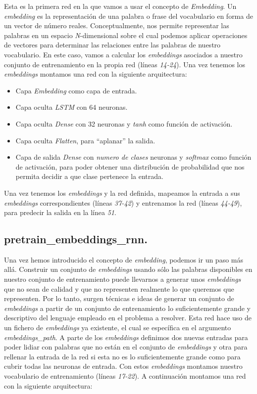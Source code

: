 \documentclass[11pt]{article}
\begin{document}
Esta es la primera red en la que vamos a usar el concepto de \textit{Embedding}. Un \textit{embedding} es la representación de una palabra o frase del vocabulario en forma de un vector de número reales. Conceptualmente, nos permite representar las palabras en un espacio \textit{N}-dimensional sobre el cual podemos aplicar operaciones de vectores para determinar las relaciones entre las palabras de nuestro vocabulario. En este caso, vamos a calcular los \textit{embeddings} asociados a nuestro conjunto de entrenamiento en la propia red (líneas \textit{14-24}). Una vez tenemos los \textit{embeddings} montamos una red con la siguiente arquitectura:
\begin{itemize}
    \item Capa \textit{Embedding} como capa de entrada.
    \item Capa oculta \textit{LSTM} con 64 neuronas.
    \item Capa oculta \textit{Dense} con 32 neuronas y \textit{tanh} como función de activación.
    \item Capa oculta \textit{Flatten}, para ``aplanar'' la salida.
    \item Capa de salida \textit{Dense} con \textit{numero de clases} neuronas y \textit{softmax} como función de activación, para poder obtener una distribución de probabilidad que nos permita decidir a que clase pertenece la entrada.
\end{itemize}

Una vez tenemos los \textit{embeddings} y la red definida, mapeamos la entrada a sus \textit{embeddings} correspondientes (líneas \textit{37-42}) y entrenamos la red (líneas \textit{44-49}), para predecir la salida en la línea \textit{51}.


\subsection{pretrain\_embeddings\_rnn.} \label{pretrainembeddingsrnn}

Una vez hemos introducido el concepto de \textit{embedding}, podemos ir un paso más allá. Construir un conjunto de \textit{embeddings} usando sólo las palabras disponibles en nuestro conjunto de entrenamiento puede llevarnos a generar unos \textit{embeddings} que no sean de calidad y que no representen realmente lo que queremos que representen. Por lo tanto, surgen técnicas e ideas de generar un conjunto de \textit{embeddings} a partir de un conjunto de entrenamiento lo suficientemente grande y descriptivo del lenguaje empleado en el problema a resolver. Esta red hace uso de un fichero de \textit{embeddings} ya existente, el cual se específica en el argumento \textit{embeddings\_path}. A parte de los \textit{embeddings} definimos dos nuevas entradas para poder lidiar con palabras que no están en el conjunto de \textit{embeddings} y otra para rellenar la entrada de la red si esta no es lo suficientemente grande como para cubrir todas las neuronas de entrada. Con estos \textit{embeddings} montamos nuestro vocabulario de entrenamiento (líneas \textit{17-22}). A continuación montamos una red con la siguiente arquitectura:
\end{document}
